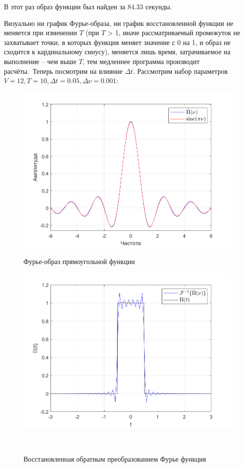 \documentclass[a4paper]{article}
\begin{document}
В этот раз образ функции был найден за 84.33 секунды.

Визуально ни график Фурье-образа, ни график восстановленной функции не меняется при изменении $T$ (при $T$ > 1, иначе рассматриваемый промежуток не захватывает точки, в которых функция меняет значение с 0 на 1, и образ не сходится к кардинальному синусу), меняется лишь время, затрачиваемое на выполнение -- чем выше $T$, тем медленнее программа производит расчёты.\ 
Теперь посмотрим на влияние $\Delta t$. Рассмотрим набор параметров $V = 12, T = 10, \Delta t = 0.05, \Delta \nu=0.001$:

\begin{figure}[H]
    \begin{minipage}{0.5\textwidth}
        \centering \includegraphics[width=\textwidth]{graphs/1/T_10_dt_0.05_V_12_dv_0.001/fourier_numerical.png}
        \caption{Фурье-образ прямоугольной функции}
    \end{minipage}\hfill
    \begin{minipage}{0.5\textwidth}
        \centering \includegraphics[width=\textwidth]{graphs/1/T_10_dt_0.05_V_12_dv_0.001/func_inversed_fourier.png}
        \caption{Восстановленная обратным преобразованием Фурье функция}
    \end{minipage}\\[1em]
\end{figure}\noindent\
\end{document}
